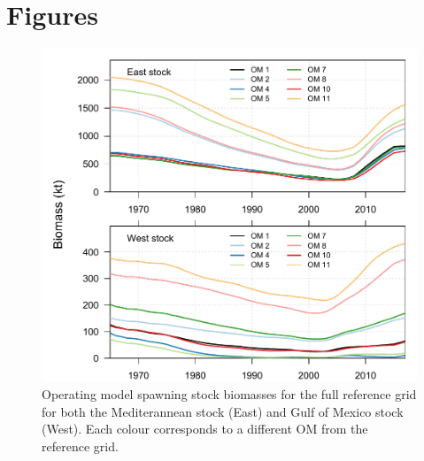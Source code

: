 \documentclass[]{article}
\begin{document}
\hypertarget{figures}{%
\section{Figures}\label{figures}}

\begin{figure}[htb]

{\centering \includegraphics[width=0.9\linewidth]{data/OMbiomass} 

}

\caption{Operating model spawning stock biomasses for the full reference grid for both the Mediterannean stock (East) and Gulf of Mexico stock (West). Each colour corresponds to a different OM from the reference grid.}\label{fig:heatMapPlot}
\end{figure}

\newpage
\singlespacing 
\end{document}
